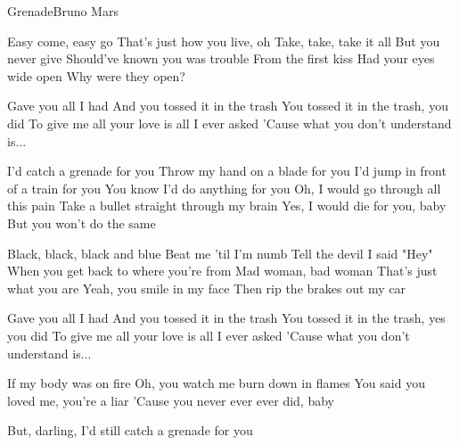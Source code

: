 \begin{Song}{Grenade}{Bruno Mars}
\begin{multicols}{2}
\begin{Verse}
Easy come, easy go
That's just how you live, oh
Take, take, take it all
But you never give
Should've known you was trouble
From the first kiss
Had your eyes wide open
Why were they open?
\end{Verse}
\espaceInterStrophe

\begin{PreChorus}
Gave you all I had
And you tossed it in the trash
You tossed it in the trash, you did
To give me all your love is all I ever asked
'Cause what you don't understand is...
\end{PreChorus}
\espaceInterStrophe

\begin{Chorus}
I'd catch a grenade for you
Throw my hand on a blade for you
I'd jump in front of a train for you
You know I'd do anything for you
Oh, I would go through all this pain
Take a bullet straight through my brain
Yes, I would die for you, baby
But you won't do the same
\end{Chorus}
\vfill
\columnbreak

\begin{Verse}
Black, black, black and blue
Beat me 'til I'm numb
Tell the devil I said "Hey"
When you get back to where you're from
Mad woman, bad woman
That's just what you are
Yeah, you smile in my face
Then rip the brakes out my car
\end{Verse}
\espaceInterStrophe

\begin{PreChorus}
Gave you all I had
And you tossed it in the trash
You tossed it in the trash, yes you did
To give me all your love is all I ever asked
'Cause what you don't understand is...
\end{PreChorus}
\espaceInterStrophe

\tochorus
\espaceInterStrophe

\begin{Bridge}
If my body was on fire
Oh, you watch me burn down in flames
You said you loved me, you're a liar
'Cause you never ever ever did, baby
\end{Bridge}
\espaceInterStrophe

\begin{Chorus}
But, darling, I'd still catch a grenade for you
\end{Chorus}


\end{multicols}
\end{Song}
